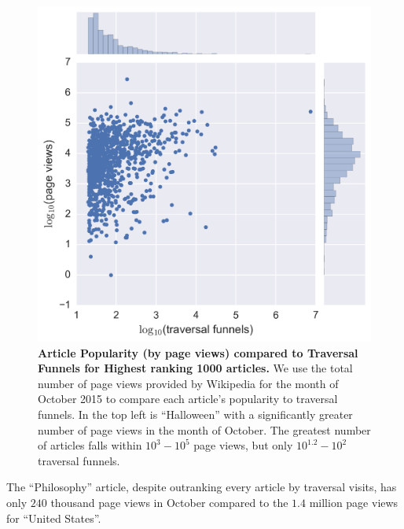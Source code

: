 \documentclass[pre,twocolumn,twoside,superscriptaddress,floatfix, aps, 10pt]{revtex4-1}
\begin{document}
\begin{figure}[tp!]
  \includegraphics[width=\columnwidth]{graphics/funnels_visits.png}
  \caption{
    \textbf{Article Popularity (by page views) compared to Traversal Funnels
    for Highest ranking 1000 articles.}
We use the total number of page views provided by Wikipedia for the month
of October 2015 to compare each article's popularity to traversal funnels.
In the top left is ``Halloween'' with a significantly greater 
number of page views in the month of October. 
The greatest number of articles falls within $10^3-10^5$ page views, 
but only $10^{1.2}-10^2$ traversal funnels.}
  \label{fig:Views and Funnels}
\end{figure}
The ``Philosophy'' article, despite outranking every article by traversal visits,
has only $240$ thousand page views in October compared to the $1.4$ million
page views for ``United States''.
\end{document}

